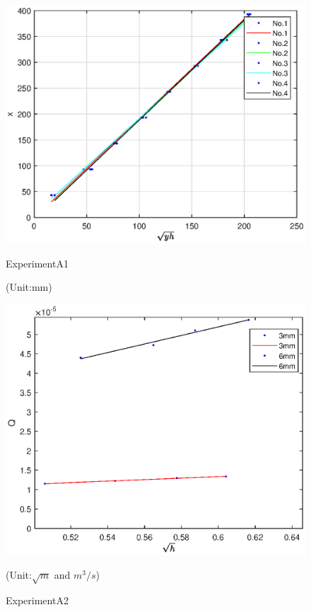 \begin{figure}[h]
    \centering
    \begin{minipage}[t]{0.49\textwidth}
        \centering
        \includegraphics[width=1.12\linewidth]{Results/1.eps}
        \caption{ExperimentA1}
        \label{ExperimentA1}
        (Unit:mm)
    \end{minipage}
    \begin{minipage}[t]{0.49\textwidth}
        \centering
        \includegraphics[width=1.12\linewidth]{Results/A2.eps}
        \caption{ExperimentA2}
        \label{ExperimentA2}
       (Unit:$\sqrt{m}$ and $m^3/s$)
    \end{minipage}
\end{figure}

